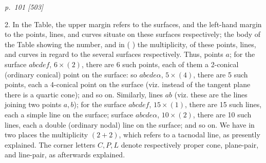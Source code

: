 \documentclass[11pt,a4paper]{article}
\newcommand{\sourcepage}[2]{%
  \bigskip
  \noindent\textit{p.~#1 [#2]}%
  \par\smallskip
}
\begin{document}
\sourcepage{101}{503}
2. In the Table, the upper margin refers to the surfaces, and the left-hand margin
to the points, lines, and curves situate on these surfaces respectively; the body of
the Table showing the number, and in ( ) the multiplicity, of these points, lines,
and curves in regard to the several surfaces respectively. Thus, points $a$; for
the surface $abcdef$, $6\times(2)$, there are 6 such points, each of them a 2-conical
(ordinary conical) point on the surface: so $abcde\alpha$, $5\times(4)$, there are
5 such points, each a 4-conical point on the surface (viz. instead of the tangent
plane there is a quartic cone); and so on. Similarly, lines $ab$ (viz. these are the
lines joining two points $a,b$); for the surface $abcdef$, $15\times(1)$, there are
15 such lines, each a simple line on the surface; surface $abcde\alpha$,
$10\times(2)$, there are 10 such lines, each a double (ordinary nodal) line on the
surface; and so on. We have in two places the multiplicity $(2+2)$, which refers
to a tacnodal line, as presently explained. The corner letters $C,P,L$ denote
respectively proper cone, plane-pair, and line-pair, as afterwards explained.
\end{document}
